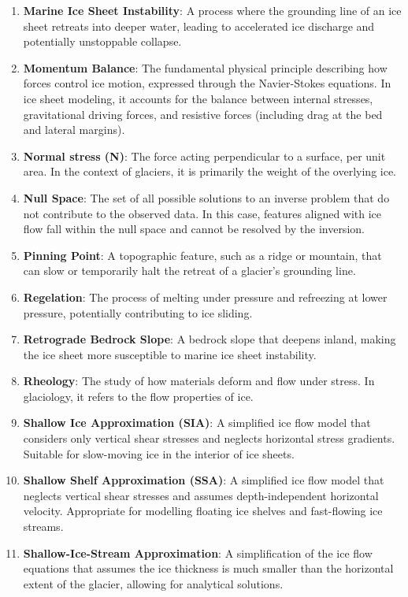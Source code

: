 \begin{enumerate}
\item \textbf{Marine Ice Sheet Instability}: A process where the grounding line of an ice sheet retreats into deeper water, leading to accelerated ice discharge and potentially unstoppable collapse.
\item \textbf{Momentum Balance}: The fundamental physical principle describing how forces control ice motion, expressed through the Navier-Stokes equations. In ice sheet modeling, it accounts for the balance between internal stresses, gravitational driving forces, and resistive forces (including drag at the bed and lateral margins).
\item \textbf{Normal stress (N)}: The force acting perpendicular to a surface, per unit area. In the context of glaciers, it is primarily the weight of the overlying ice.
\item \textbf{Null Space}: The set of all possible solutions to an inverse problem that do not contribute to the observed data. In this case, features aligned with ice flow fall within the null space and cannot be resolved by the inversion.
\item \textbf{Pinning Point}: A topographic feature, such as a ridge or mountain, that can slow or temporarily halt the retreat of a glacier's grounding line.
\item \textbf{Regelation}: The process of melting under pressure and refreezing at lower pressure, potentially contributing to ice sliding.
\item \textbf{Retrograde Bedrock Slope}: A bedrock slope that deepens inland, making the ice sheet more susceptible to marine ice sheet instability.
\item \textbf{Rheology}: The study of how materials deform and flow under stress. In glaciology, it refers to the flow properties of ice.
\item \textbf{Shallow Ice Approximation (SIA)}: A simplified ice flow model that considers only vertical shear stresses and neglects horizontal stress gradients. Suitable for slow-moving ice in the interior of ice sheets.
\item \textbf{Shallow Shelf Approximation (SSA)}: A simplified ice flow model that neglects vertical shear stresses and assumes depth-independent horizontal velocity. Appropriate for modelling floating ice shelves and fast-flowing ice streams.
\item \textbf{Shallow-Ice-Stream Approximation}: A simplification of the ice flow equations that assumes the ice thickness is much smaller than the horizontal extent of the glacier, allowing for analytical solutions.

\end{enumerate}
